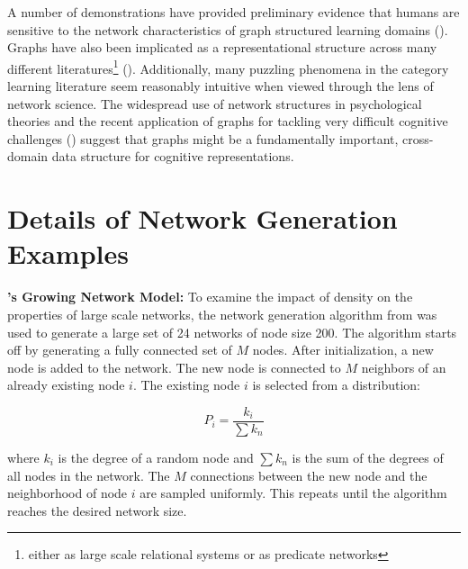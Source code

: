 \documentclass[12pt]{article}
\let\oldcite=\cite
\let\oldtextcite=\textcite
\renewcommand{\cite}[1]{\textcolor[rgb]{0, .121, .388}{\oldcite{#1}}}
\renewcommand{\textcite}[1]{\textcolor[rgb]{0, .121, .388}{\oldtextcite{#1}}}
\begin{document}
A number of demonstrations have provided preliminary evidence that humans are sensitive to the network characteristics of graph structured learning domains (\cite{lynn2019graph,karuza2019human,kahn2018network,wu2020inference}). Graphs have also been implicated as a representational structure across many different literatures\footnote{either as large scale relational systems or as predicate networks} (\cite{abbott2012human,vitevitch2008can,gentner1983structure,griffiths2010probabilistic}). Additionally, many puzzling phenomena in the category learning literature seem reasonably intuitive when viewed through the lens of network science. The widespread use of network structures in psychological theories and the recent application of graphs for tackling very difficult cognitive challenges (\cite{wu2020comprehensive,hamrick2018relational,han2008bottom,graves2016hybrid}) suggest that graphs might be a fundamentally important, cross-domain data structure for cognitive representations.






%
%

\pagebreak
\pagestyle{empty}
\renewcommand\bibname{References}
\printbibliography



%
%
\pagebreak
\appendix
\appendixpage
\addappheadtotoc

\section{Details of Network Generation Examples}

\textbf{\textcite{steyvers2005large}'s Growing Network Model:} To examine the impact of density on the properties of large scale networks, the network generation algorithm from \textcite{steyvers2005large} was used to generate a large set of 24 networks of node size 200. The algorithm starts off by generating a fully connected set of \(M\) nodes. After initialization, a new node is added to the network. The new node is connected to \(M\) neighbors of an already existing node \(i\). The existing node \(i\) is selected from a distribution:

$$ P_{i} = \frac{k_i}{\sum{k_n}} $$

where \(k_i\) is the degree of a random node and \(\sum{k_n}\) is the sum of the degrees of all nodes in the network. The \(M\) connections between the new node and the neighborhood of node \(i\) are sampled uniformly. This repeats until the algorithm reaches the desired network size.

\end{document}
